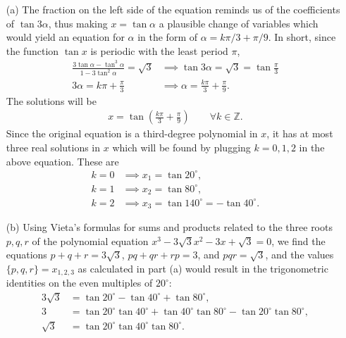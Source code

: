 \begin{solution}[name=Solution by Parviz Shahriari]
\begin{itemize}
    \item[(a)] The fraction on the left side of the equation reminds us of the coefficients of $\tan 3\alpha$, thus making $x=\tan \alpha$ a plausible change of variables which would yield an equation for $\alpha$ in the form of $\alpha = k\pi/3 + \pi/9$. In short, since the function $\tan x$ is periodic with the least period $\pi$,
    \begin{align*}
        \frac{3\tan \alpha - \tan^3 \alpha}{1 - 3 \tan^2 \alpha} = \sqrt 3 &\implies \tan 3 \alpha = \sqrt 3 = \tan \frac{\pi}{3}\\ 3\alpha = k\pi + \frac{\pi}{3} &\implies \alpha = \frac{k\pi}{3}+\frac{\pi}{9}.
    \end{align*}
    The solutions will be
    \begin{align*}
        x=\tan\left(\frac{k\pi}{3}+\frac{\pi}{9}\right) \qquad \forall k \in \mathbb Z.
    \end{align*}
    Since the original equation is a third-degree polynomial in $x$, it has at most three real solutions in $x$ which will be found by plugging $k=0,1,2$ in the above equation. These are
    \begin{align*}
        k=0 & \implies x_1 = \tan 20^\circ,\\
        k=1 & \implies x_2 = \tan 80^\circ,\\
        k=2 &\implies x_3 = \tan 140^\circ = -\tan 40^\circ.
    \end{align*}
    \item[(b)] Using Vieta's formulas for sums and products related to the three roots $p,q,r$ of the polynomial equation $x^3 - 3\sqrt 3 x^2 - 3x + \sqrt 3 = 0$, we find the equations $p+q+r=3\sqrt 3$, $pq+qr+rp=3$, and $pqr=\sqrt 3$, and the values $\{p,q,r\}=x_{1,2,3}$ as calculated in part (a) would result in the trigonometric identities on the even multiples of $20^\circ$:
    \begin{align*}
        3 \sqrt 3 &= \tan 20^\circ - \tan 40^\circ + \tan 80^\circ,\\
        3 &= \tan 20^\circ \tan 40^\circ + \tan 40^\circ \tan 80^\circ - \tan 20^\circ\tan 80^\circ,\\
        \sqrt 3 &= \tan 20^\circ \tan 40^\circ \tan 80^\circ.
    \end{align*}
\end{itemize}
\end{solution}



